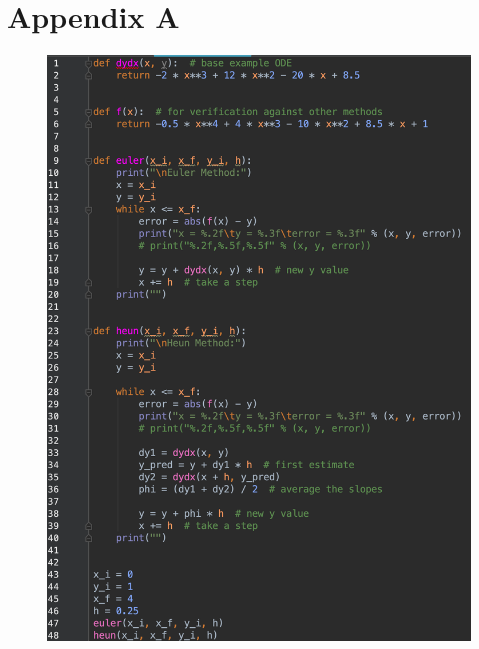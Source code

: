 \documentclass[12pt, letterpaper]{article}
\begin{document}
\pagebreak
\appendix
	\section{Appendix A}
            	\begin{figure}[h]
            		\centering
            		\includegraphics[width=0.78899\linewidth]{PythonCode.png}
            	\end{figure}
		
		
		
\end{document}
